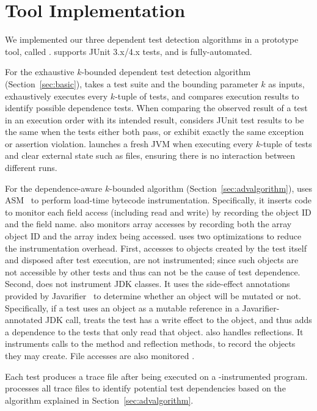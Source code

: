\section{Tool Implementation}
\label{sec:impl}


We implemented our three dependent test detection algorithms in
a prototype tool, called \ourtool. \ourtool
supports JUnit 3.x/4.x tests, and is fully-automated.

For the exhaustive $k$-bounded dependent test detection algorithm
(Section~\ref{sec:basic}), \ourtool takes a test suite
and the bounding parameter $k$ as inputs, 
exhaustively executes every $k$-tuple
of tests, and compares execution results to identify possible
dependence tests. When
comparing the observed result of a test in an execution order with
its intended result,
\ourtool considers JUnit test results to be the same when the
tests either both pass, or exhibit exactly the same exception
or assertion violation.
\ourtool launches a fresh JVM when executing every
$k$-tuple of tests and clear external state such
as files, ensuring there is no interaction between
different runs. 

For the dependence-aware $k$-bounded algorithm (Section~\ref{sec:advalgorithm}),
\ourtool uses ASM~\cite{asm} to perform load-time bytecode
instrumentation. Specifically, it inserts code to monitor each
field access (including read and write) by recording the
object ID and the field name.
\ourtool also monitors array accesses by recording
both the array object ID and the array index being accessed.
\ourtool uses two optimizations to reduce the
instrumentation overhead. First, accesses to objects
created by the test itself and disposed
after test execution, are not instrumented; since such 
objects are not accessible by other tests and thus can not
be the cause of test dependence. Second,
\ourtool does not instrument JDK classes. It uses the side-effect
annotations provided by Javarifier~\cite{QuinonezTE2008} to 
determine whether an object will be mutated or not.
Specifically, if a test uses an object as a mutable reference
in a Javarifier-annotated JDK call, \ourtool treats the test
has a write effect to the object, and thus adds a dependence
to the tests that only read that object. 
\ourtool also handles reflections. It instruments
calls to the  method and reflection
methods, to record the objects they may create.
File accesses are also monitored .

Each test produces a trace file after being
executed on a \ourtool-instrumented program. \ourtool
processes all trace files to identify potential
test dependencies based on the algorithm explained in
Section~\ref{sec:advalgorithm}.


